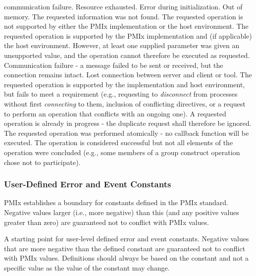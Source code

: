 \begin{constantdesc}
communication failure.
%
Resource exhausted.
%
Error during initialization.
%
Out of memory.
%
The requested information was not found.
%
The requested operation is not supported by either the \ac{PMIx} implementation
or the host environment.
%
The requested operation is supported by the \ac{PMIx} implementation and (if applicable) the host environment. However, at least one supplied parameter was given an unsupported value, and the operation cannot therefore be executed as requested.
%
Communication failure - a message failed to be sent or received, but the
connection remains intact.
%
Lost connection between server and client or tool.
%
The requested operation is supported by the implementation and host environment, but fails to meet a requirement (e.g., requesting to \textit{disconnect} from processes without first \textit{connecting} to them, inclusion of conflicting directives, or a request to perform an operation that conflicts with an ongoing one).
%
A requested operation is already in progress - the duplicate request
shall therefore be ignored.
%
The requested operation was performed atomically - no callback function will be executed.
%
The operation is considered successful but not all elements of the operation were concluded (e.g., some members of a group construct operation chose not to participate).
%
\end{constantdesc}


\subsubsection{User-Defined Error and Event Constants}
\label{api:struct:usererrors}

\ac{PMIx} establishes a boundary for constants defined in the \ac{PMIx} standard. Negative values larger (i.e., more negative) than this (and any positive values greater than zero) are guaranteed not to conflict with \ac{PMIx} values.

\begin{constantdesc}
%
A starting point for user-level defined error and event constants.
Negative values that are more negative than the defined constant are guaranteed not to conflict with \ac{PMIx} values.
Definitions should always be based on the  constant and not a specific value as the value of the constant may change.
%
\end{constantdesc}



